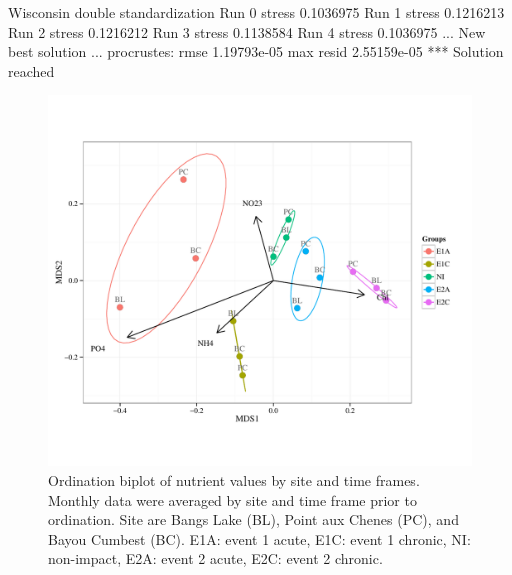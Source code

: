 \documentclass[letterpaper,12pt]{article}\usepackage[]{graphicx}\usepackage[]{color}
\makeatletter
\def\maxwidth{ %
  \ifdim\Gin@nat@width>\linewidth
    \linewidth
  \else
    \Gin@nat@width
  \fi
}
\makeatother
\begin{document}
\clearpage

Wisconsin double standardization
Run 0 stress 0.1036975 
Run 1 stress 0.1216213 
Run 2 stress 0.1216212 
Run 3 stress 0.1138584 
Run 4 stress 0.1036975 
... New best solution
... procrustes: rmse 1.19793e-05  max resid 2.55159e-05 
*** Solution reached
\begin{figure}[!ht]

{\centering \includegraphics[width=\maxwidth]{figs/ordfig-1} 

}

\caption[Ordination biplot of nutrient values by site and time frames]{Ordination biplot of nutrient values by site and time frames. Monthly data were averaged by site and time frame prior to ordination.  Site are Bangs Lake (BL), Point aux Chenes (PC), and Bayou Cumbest (BC). E1A: event 1 acute, E1C: event 1 chronic, NI: non-impact, E2A: event 2 acute, E2C: event 2 chronic.}\label{fig:ordfig}
\end{figure}


\clearpage
\end{document}
